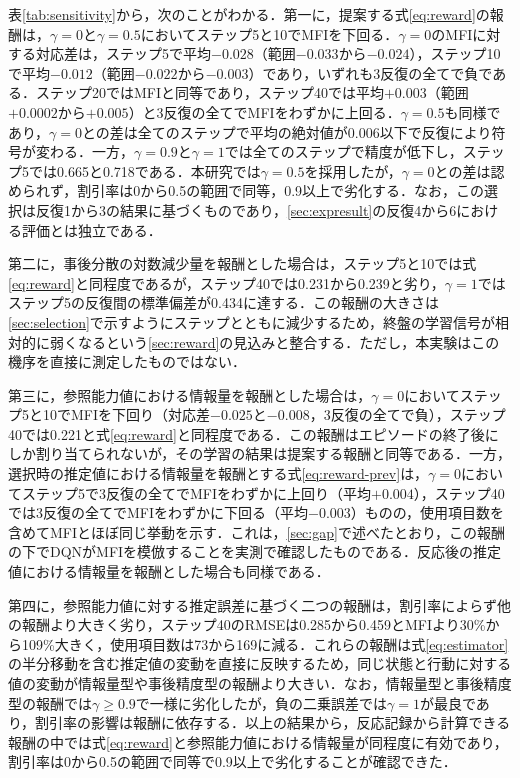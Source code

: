 \documentclass[paper]{ieicej}
\begin{document}
表\ref{tab:sensitivity}から，次のことがわかる．第一に，提案する式\eqref{eq:reward}の報酬は，$\gamma=0$と$\gamma=0.5$においてステップ5と10でMFIを下回る．$\gamma=0$のMFIに対する対応差は，ステップ5で平均$-0.028$（範囲$-0.033$から$-0.024$），ステップ10で平均$-0.012$（範囲$-0.022$から$-0.003$）であり，いずれも3反復の全てで負である．ステップ20ではMFIと同等であり，ステップ40では平均$+0.003$（範囲$+0.0002$から$+0.005$）と3反復の全てでMFIをわずかに上回る．$\gamma=0.5$も同様であり，$\gamma=0$との差は全てのステップで平均の絶対値が0.006以下で反復により符号が変わる．一方，$\gamma=0.9$と$\gamma=1$では全てのステップで精度が低下し，ステップ5では0.665と0.718である．本研究では$\gamma=0.5$を採用したが，$\gamma=0$との差は認められず，割引率は0から0.5の範囲で同等，0.9以上で劣化する．なお，この選択は反復1から3の結果に基づくものであり，\ref{sec:expresult}の反復4から6における評価とは独立である．

第二に，事後分散の対数減少量を報酬とした場合は，ステップ5と10では式\eqref{eq:reward}と同程度であるが，ステップ40では0.231から0.239と劣り，$\gamma=1$ではステップ5の反復間の標準偏差が0.434に達する．この報酬の大きさは\ref{sec:selection}で示すようにステップとともに減少するため，終盤の学習信号が相対的に弱くなるという\ref{sec:reward}の見込みと整合する．ただし，本実験はこの機序を直接に測定したものではない．

第三に，参照能力値における情報量を報酬とした場合は，$\gamma=0$においてステップ5と10でMFIを下回り（対応差$-0.025$と$-0.008$，3反復の全てで負），ステップ40では0.221と式\eqref{eq:reward}と同程度である．この報酬はエピソードの終了後にしか割り当てられないが，その学習の結果は提案する報酬と同等である．一方，選択時の推定値における情報量を報酬とする式\eqref{eq:reward-prev}は，$\gamma=0$においてステップ5で3反復の全てでMFIをわずかに上回り（平均$+0.004$），ステップ40では3反復の全てでMFIをわずかに下回る（平均$-0.003$）ものの，使用項目数を含めてMFIとほぼ同じ挙動を示す．これは，\ref{sec:gap}で述べたとおり，この報酬の下でDQNがMFIを模倣することを実測で確認したものである．反応後の推定値における情報量を報酬とした場合も同様である．

第四に，参照能力値に対する推定誤差に基づく二つの報酬は，割引率によらず他の報酬より大きく劣り，ステップ40のRMSEは0.285から0.459とMFIより30\%から109\%大きく，使用項目数は73から169に減る．これらの報酬は式\eqref{eq:estimator}の半分移動を含む推定値の変動を直接に反映するため，同じ状態と行動に対する値の変動が情報量型や事後精度型の報酬より大きい．なお，情報量型と事後精度型の報酬では$\gamma\ge0.9$で一様に劣化したが，負の二乗誤差では$\gamma=1$が最良であり，割引率の影響は報酬に依存する．以上の結果から，反応記録から計算できる報酬の中では式\eqref{eq:reward}と参照能力値における情報量が同程度に有効であり，割引率は0から0.5の範囲で同等で0.9以上で劣化することが確認できた．
\end{document}
